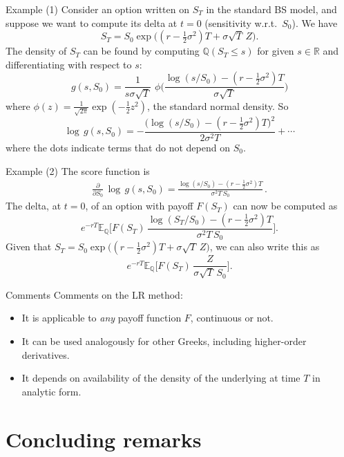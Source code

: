\documentclass[pdf, handout]{beamer}
\begin{document}
\begin{frame}{Example (1)}
Consider an option written on $S_T$ in the standard BS model, and suppose we want to
compute its delta at $t=0$ (sensitivity w.r.t.\ $S_0$). We have
$$
S_T = S_0 \exp\big( (r-\tfrac{1}{2}\sigma^2)T + \sigma\sqrt{T}\, Z \big).
$$
\pause
The density of $S_T$ can be found by computing $\mathbb{Q}(S_T \leq s)$ for given $s \in \mathbb{R}$ and
differentiating with respect to $s$:
$$
g(s,S_0) = \frac{1}{s\sigma\sqrt{T}} \,\,\phi\Bigg( \frac{\log(s/S_0) - (r-\frac{1}{2}\sigma^2)T}
{\sigma \sqrt{T}} \Bigg)
$$
where $\phi(z)=\frac{1}{\sqrt{2\pi}}\exp(-\tfrac{1}{2}z^2)$, the standard normal density.
\pause
So
$$
\log\, g(s,S_0) = -\frac{\big(\log(s/S_0) - (r-\frac{1}{2}\sigma^2)T\big)^2}
{2\sigma^2 T}  + \cdots
$$
where the dots indicate terms that do not depend on $S_0$.
\end{frame}

\begin{frame}{Example (2)}
\vskip2mm
The score function is
\begin{align*}
\frac{\partial}{\partial S_0} \, \log\, g(s,S_0)
= \frac{\log(s/S_0) - (r-\frac{1}{2}\sigma^2)T}{\sigma^2 T \, S_0}\,.
\end{align*}
\pause
The delta, at $t=0$, of an option with payoff $F(S_T)$ can now be computed as
$$
e^{-rT} \mathbb{E}_{\mathbb{Q}}\Bigg[ F(S_T) \, \frac{\log(S_T/S_0) - (r-\frac{1}{2}\sigma^2)T}{\sigma^2 T \, S_0}\Bigg].
$$
\pause
Given that $S_T = S_0 \exp\big( (r-\tfrac{1}{2}\sigma^2)T + \sigma\sqrt{T}\, Z \big)$,
we can also write this as
$$
e^{-rT} \mathbb{E}_{\mathbb{Q}}\Bigg[ F(S_T) \, \frac{Z}{\sigma \sqrt{T} \,S_0} \Bigg].
$$
\end{frame}

\begin{frame}{Comments}
Comments on the LR method:
\vskip1mm
\begin{itemize}
\itemsep3mm
\item It is applicable to \emph{any} payoff function $F$, continuous or not.\pause
\item It can be used analogously for other Greeks, including higher-order derivatives.\pause
\item It depends on availability of the density of the underlying at time $T$ in
analytic form.
\end{itemize}
\end{frame}



\section{Concluding remarks}
\end{document}
